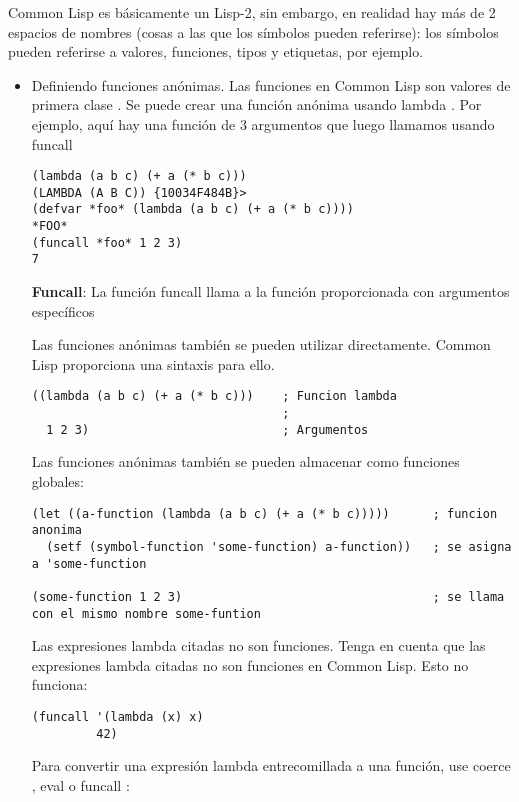 \documentclass[11pt]{article}
\begin{document}
\begin{itemize}
Common Lisp es básicamente un Lisp-2, sin embargo, en realidad hay más
de 2 espacios de nombres (cosas a las que los símbolos pueden
referirse): los símbolos pueden referirse a valores, funciones, tipos
y etiquetas, por ejemplo.


\begin{itemize}
\item Definiendo funciones anónimas.
\label{sec:orga006ec3}
Las funciones en Common Lisp son valores de primera clase . Se puede
crear una función anónima usando lambda . Por ejemplo, aquí hay una
función de 3 argumentos que luego llamamos usando funcall

\begin{verbatim}
(lambda (a b c) (+ a (* b c)))
(LAMBDA (A B C)) {10034F484B}>
(defvar *foo* (lambda (a b c) (+ a (* b c))))
*FOO*
(funcall *foo* 1 2 3)
7
\end{verbatim}

\textbf{Funcall}: La función funcall llama a la función proporcionada con argumentos específicos 

Las funciones anónimas también se pueden utilizar directamente. Common
Lisp proporciona una sintaxis para ello.

\begin{verbatim}
((lambda (a b c) (+ a (* b c)))    ; Funcion lambda 
                                   ; 
  1 2 3)                           ; Argumentos

\end{verbatim}


Las funciones anónimas también se pueden almacenar como funciones globales:
\begin{verbatim}
(let ((a-function (lambda (a b c) (+ a (* b c)))))      ; funcion anonima 
  (setf (symbol-function 'some-function) a-function))   ; se asigna a 'some-function

(some-function 1 2 3)                                   ; se llama con el mismo nombre some-funtion

\end{verbatim}


Las expresiones lambda citadas no son funciones. Tenga en cuenta que
las expresiones lambda citadas no son funciones en Common Lisp. Esto
no funciona:

\begin{verbatim}
(funcall '(lambda (x) x)
         42)

\end{verbatim}

Para convertir una expresión lambda entrecomillada a una función, use
coerce , eval o funcall :


\end{itemize}
\end{itemize}
\end{document}
